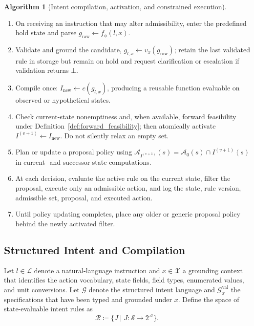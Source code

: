 \documentclass[journal]{IEEEtran}
\theoremstyle{definition}
\newtheorem{algorithm}{Algorithm}
\newcommand{\cS}{\mathcal{S}}
\newcommand{\cA}{\mathcal{A}}
\newcommand{\cL}{\mathcal{L}}
\newcommand{\cX}{\mathcal{X}}
\newcommand{\cG}{\mathcal{G}}
\newcommand{\cR}{\mathcal{R}}
\begin{document}
\noindent\begin{minipage}{\linewidth}
\begin{algorithm}[Intent compilation, activation, and constrained execution]
\label{alg:lifecycle}
\mbox{}\par\smallskip
\begin{enumerate}[leftmargin=*,label=\arabic*.,nosep]
  \item On receiving an instruction that may alter admissibility, enter the
  predefined hold state and parse
  $g_{\mathrm{raw}}\leftarrow f_\phi(l,x)$.
  \item Validate and ground the candidate,
  $g_{l,x}\leftarrow v_x(g_{\mathrm{raw}})$; retain the last validated rule in
  storage but remain on hold and request clarification or escalation if validation
  returns $\bot$.
  \item Compile once:
  $I_{\mathrm{new}}\leftarrow c(g_{l,x})$, producing a reusable
  function evaluable on observed or hypothetical states.
  \item Check current-state nonemptiness and, when available, forward
  feasibility under Definition~\ref{def:forward_feasibility}; then atomically
  activate $I^{(v+1)}\leftarrow I_{\mathrm{new}}$. Do not silently relax an
  empty set.
  \item Plan or update a proposal policy using
  $\cA_{I^{(v+1)}}(s)=\cA_0(s)\cap I^{(v+1)}(s)$ in current-
  and successor-state computations.
  \item At each decision, evaluate the active rule on the current state, filter
  the proposal, execute only an admissible action, and log the state, rule
  version, admissible set, proposal, and executed action.
  \item Until policy updating completes, place any older or generic proposal
  policy behind the newly activated filter.
\end{enumerate}
\end{algorithm}
\end{minipage}
\par\smallskip

\subsection{Structured Intent and Compilation}
\label{subsec:parsing}

Let $l \in \cL$ denote a natural-language instruction and $x\in\cX$ a
grounding context that identifies the action vocabulary, state fields, field
types, enumerated values, and unit conversions. Let $\cG$ denote the
structured intent language and $\cG_x^{\mathrm{val}}$ the specifications
that have been typed and grounded under $x$. Define the space of
state-evaluable intent rules as
\[
  \cR
  \coloneqq
  \{J\mid J:\cS\to 2^{\cA}\}.
\]
\end{document}
